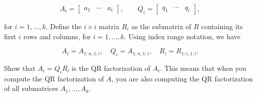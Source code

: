 \[A_{i}=\left[\begin{array}{cccc}a_{1}&\cdots&a_{i}\end{array}\right],\qquad Q _{i}=\left[\begin{array}{cccc}q_{1}&\cdots&q_{i}\end{array}\right],\]

for \(i=1,\ldots,k\). Define the \(i\times i\) matrix \(R_{i}\) as the submatrix of \(R\) containing its first \(i\) rows and columns, for \(i=1,\ldots,k\). Using index range notation, we have

\[A_{i}=A_{1:n,1:i},\quad Q_{i}=A_{1:n,1:i},\quad R_{i}=R_{1:i,1:i}.\]

Show that \(A_{i}=Q_{i}R_{i}\) is the QR factorization of \(A_{i}\). This means that when you compute the QR factorization of \(A\), you are also computing the QR factorization of all submatrices \(A_{1},\ldots,A_{k}\).

